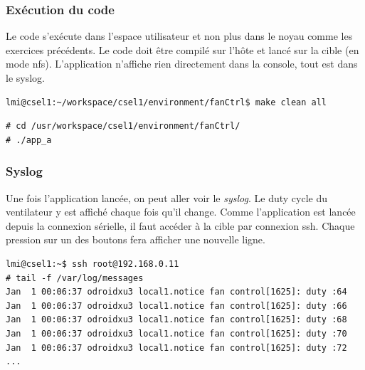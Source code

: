 \subsubsection{Exécution du code}
Le code s'exécute dans l'espace utilisateur et non plus dans le noyau comme les exercices précédents. Le code doit être compilé sur l'hôte et lancé sur la cible (en mode nfs). L'application n'affiche rien directement dans la console, tout est dans le syslog.
\begin{lstlisting}
lmi@csel1:~/workspace/csel1/environment/fanCtrl$ make clean all
\end{lstlisting}
\begin{lstlisting}
# cd /usr/workspace/csel1/environment/fanCtrl/
# ./app_a  
\end{lstlisting}
\subsubsection{Syslog}
Une fois l'application lancée, on peut aller voir le \textit{syslog}. Le duty cycle du ventilateur y est affiché chaque fois qu'il change. Comme l'application est lancée depuis la connexion sérielle, il faut accéder à la cible par connexion ssh. Chaque pression sur un des boutons fera afficher une nouvelle ligne.\\
\begin{lstlisting}
lmi@csel1:~$ ssh root@192.168.0.11
# tail -f /var/log/messages
Jan  1 00:06:37 odroidxu3 local1.notice fan control[1625]: duty :64
Jan  1 00:06:37 odroidxu3 local1.notice fan control[1625]: duty :66
Jan  1 00:06:37 odroidxu3 local1.notice fan control[1625]: duty :68
Jan  1 00:06:37 odroidxu3 local1.notice fan control[1625]: duty :70
Jan  1 00:06:37 odroidxu3 local1.notice fan control[1625]: duty :72
...
\end{lstlisting}
